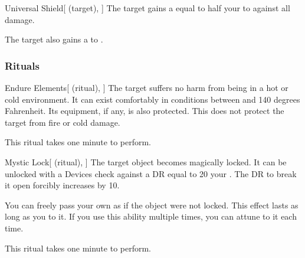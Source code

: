 \lowercase{\hypertarget{spell:Universal Shield}{}}\label{spell:Universal Shield}
\begin{attuneability}[Rank 6]{\hypertarget{spell:Universal Shield}{Universal Shield}}[ (target), ]
The target gains a  equal to half your  to  against all damage.

\rankline
{} The target also gains a   to .
\end{attuneability}
\vspace{0.25em}



\subsubsection{Rituals}


\lowercase{\hypertarget{spell:Endure Elements}{}}\label{spell:Endure Elements}
\begin{attuneability}[Rank 1]{\hypertarget{spell:Endure Elements}{Endure Elements}}[ (ritual), ]
The target suffers no harm from being in a hot or cold environment.
It can exist comfortably in conditions between  and 140 degrees Fahrenheit.
Its equipment, if any, is also protected.
This does not protect the target from fire or cold damage.

This ritual takes one minute to perform.
\end{attuneability}
\vspace{0.25em}



\lowercase{\hypertarget{spell:Mystic Lock}{}}\label{spell:Mystic Lock}
\begin{attuneability}[Rank 3]{\hypertarget{spell:Mystic Lock}{Mystic Lock}}[ (ritual), ]
The target object becomes magically locked.
It can be unlocked with a Devices check against a DR equal to 20 \add your .
The DR to break it open forcibly increases by 10.

You can freely pass your own  as if the object were not locked.
This effect lasts as long as you  to it.
If you use this ability multiple times, you can attune to it each time.

This ritual takes one minute to perform.
\end{attuneability}
\vspace{0.25em}




